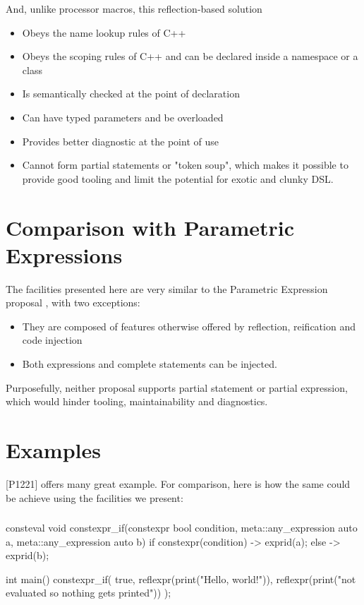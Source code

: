 \documentclass{wg21}
\begin{document}
And, unlike processor macros, this reflection-based solution
\begin{itemize}
    \item Obeys the name lookup rules of C++
    \item Obeys the scoping rules of C++ and can be declared inside a namespace or a class
    \item Is semantically checked at the point of declaration
    \item Can have typed parameters and be overloaded
    \item Provides better diagnostic at the point of use
    \item Cannot form partial statements or "token soup", which makes it possible to provide good tooling and limit the potential for exotic and clunky DSL.
\end{itemize}

\section{Comparison with Parametric Expressions}

The facilities presented here are very similar to the Parametric Expression proposal \cite{P1221R1}, with two exceptions:
\begin{itemize}
\item They are composed of features otherwise offered by reflection, reification and code injection
\item Both expressions and complete statements can be injected.
\end{itemize}

Purposefully, neither proposal supports partial statement or partial expression, which would hinder tooling, maintainability
and diagnostics.

\section{Examples}
[P1221] \cite{P1221R1} offers many great example.
For comparison, here is how the same could be achieve using the facilities we present:

\subsubsection{}


\begin{colorblock}
consteval void constexpr_if(constexpr bool condition, 
                   meta::any_expression auto a,
                   meta::any_expression auto b) {
    if constexpr(condition){
        -> exprid(a);
    }
    else {
        -> exprid(b);
    }
}

int main() {
    constexpr_if(
       true,
       reflexpr(print("Hello, world!")),
       reflexpr(print("not evaluated so nothing gets printed"))
    );
}
\end{colorblock}
\end{document}
